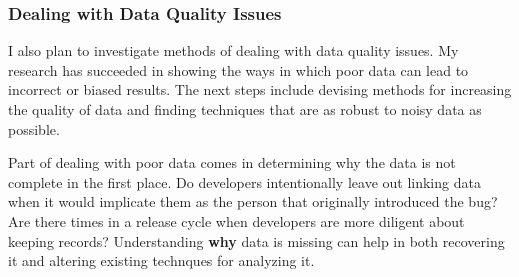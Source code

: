 \documentclass[10pt]{article}
\newcommand\Subsection[1]{\subsubsection*{\small #1}}
\begin{document}
\begin{small}
\begin{enumerate}
\end{enumerate}


\Subsection{Dealing with Data Quality Issues}

I also plan to investigate methods of dealing with data quality issues.  My
research has succeeded in showing the ways in which poor data can lead to
incorrect or biased results.  The next steps include devising methods for
increasing the quality of data and finding techniques that are as robust to
noisy data as possible.

Part of dealing with poor data comes in determining why the data is not complete
in the first place.  Do developers intentionally leave out linking data when it would
implicate them as the person that originally introduced the bug?  Are there times
in a release cycle when developers are more diligent about keeping records?  Understanding
\textbf{why} data is missing can help in both recovering it and altering existing technques
for analyzing it.

\vspace{0.5cm}

\end{small}

\begin{footnotesize}

%
%

\end{footnotesize}
\end{document}
